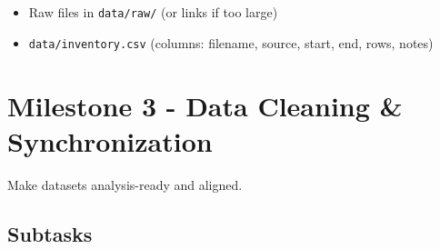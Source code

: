 \documentclass[11pt,a4paper]{article}
\begin{document}
\begin{deliverablebox}
\begin{itemize}
    \item Raw files in \texttt{data/raw/} (or links if too large)
    \item \texttt{data/inventory.csv} (columns: filename, source, start, end, rows, notes)
\end{itemize}
\end{deliverablebox}

\section{Milestone 3 - Data Cleaning \& Synchronization}

\begin{objectivebox}
Make datasets analysis-ready and aligned.
\end{objectivebox}

\subsection{Subtasks}
\end{document}
